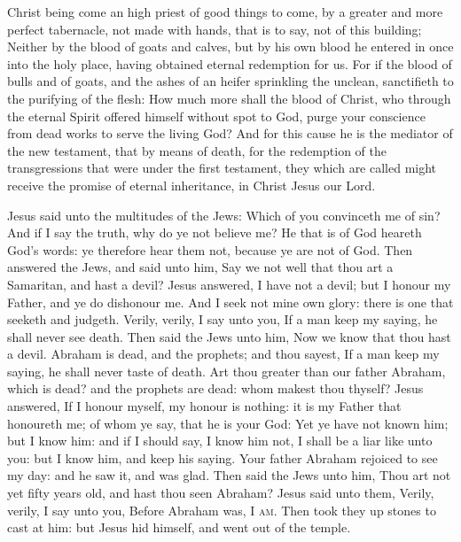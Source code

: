  Christ being come an high priest of good things to come, by a greater and more perfect tabernacle, not made with hands, that is to say, not of this building; Neither by the blood of goats and calves, but by his own blood he entered in once into the holy place, having obtained eternal redemption for us. For if the blood of bulls and of goats, and the ashes of an heifer sprinkling the unclean, sanctifieth to the purifying of the flesh: How much more shall the blood of Christ, who through the eternal Spirit offered himself without spot to God, purge your conscience from dead works to serve the living God? And for this cause he is the mediator of the new testament, that by means of death, for the redemption of the transgressions that were under the first testament, they which are called might receive the promise of eternal inheritance, in Christ Jesus our Lord.


 Jesus said unto the multitudes of the Jews: Which of you convinceth me of sin? And if I say the truth, why do ye not believe me? He that is of God heareth God's words: ye therefore hear them not, because ye are not of God. Then answered the Jews, and said unto him, Say we not well that thou art a Samaritan, and hast a devil? Jesus answered, I have not a devil; but I honour my Father, and ye do dishonour me. And I seek not mine own glory: there is one that seeketh and judgeth. Verily, verily, I say unto you, If a man keep my saying, he shall never see death. Then said the Jews unto him, Now we know that thou hast a devil. Abraham is dead, and the prophets; and thou sayest, If a man keep my saying, he shall never taste of death. Art thou greater than our father Abraham, which is dead? and the prophets are dead: whom makest thou thyself? Jesus answered, If I honour myself, my honour is nothing: it is my Father that honoureth me; of whom ye say, that he is your God: Yet ye have not known him; but I know him: and if I should say, I know him not, I shall be a liar like unto you: but I know him, and keep his saying. Your father Abraham rejoiced to see my day: and he saw it, and was glad. Then said the Jews unto him, Thou art not yet fifty years old, and hast thou seen Abraham? Jesus said unto them, Verily, verily, I say unto you, Before Abraham was, \textsc{I am}. Then took they up stones to cast at him: but Jesus hid himself, and went out of the temple.

